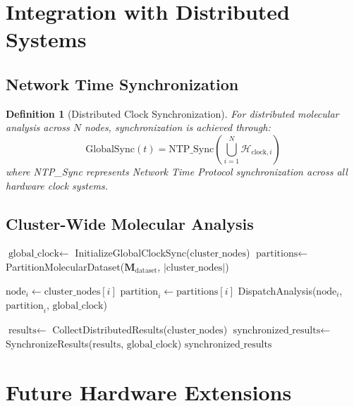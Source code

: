 \documentclass[12pt,a4paper]{article}
\newtheorem{definition}[theorem]{Definition}
\begin{document}
\section{Integration with Distributed Systems}

\subsection{Network Time Synchronization}

\begin{definition}[Distributed Clock Synchronization]
For distributed molecular analysis across $N$ nodes, synchronization is achieved through:
\begin{equation}
\text{GlobalSync}(t) = \text{NTP\_Sync}\left(\bigcup_{i=1}^{N} \mathcal{H}_{\text{clock},i}\right)
\end{equation}
where NTP\_Sync represents Network Time Protocol synchronization across all hardware clock systems.
\end{definition}

\subsection{Cluster-Wide Molecular Analysis}

\begin{algorithm}[H]
\caption{Distributed Hardware-Virtual Spectroscopy}
\begin{algorithmic}[1]
    \State $\text{global\_clock} \gets$ InitializeGlobalClockSync($\text{cluster\_nodes}$)
    \State $\text{partitions} \gets$ PartitionMolecularDataset($\mathbf{M}_{\text{dataset}}$, $|\text{cluster\_nodes}|$)

        \State $\text{node}_i \gets \text{cluster\_nodes}[i]$
        \State $\text{partition}_i \gets \text{partitions}[i]$
        \State DispatchAnalysis($\text{node}_i$, $\text{partition}_i$, $\text{global\_clock}$)
    \EndFor

    \State $\text{results} \gets$ CollectDistributedResults($\text{cluster\_nodes}$)
    \State $\text{synchronized\_results} \gets$ SynchronizeResults($\text{results}$, $\text{global\_clock}$)
    \State \Return $\text{synchronized\_results}$
\EndProcedure
\end{algorithmic}
\end{algorithm}

\section{Future Hardware Extensions}
\end{document}
